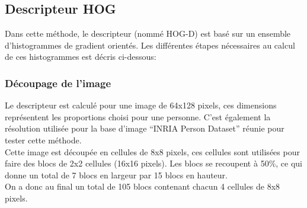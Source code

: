 \documentclass[12pt]{article}
\begin{document}
\subsection{Descripteur HOG}
Dans cette méthode, le descripteur (nommé HOG-D) est basé sur un ensemble d'histogrammes de gradient orientés. Les différentes étapes nécessaires au calcul de ces histogrammes est décris ci-dessous:
\subsubsection{Découpage de l'image}
Le descripteur est calculé pour une image de 64x128 pixels, ces dimensions représentent les proportions choisi pour une personne. C'est également la résolution utilisée pour la base d'image ``INRIA Person Dataset'' réunie pour tester cette méthode.\\
Cette image est découpée en cellules de 8x8 pixels, ces cellules sont utilisées pour faire des blocs de 2x2 cellules (16x16 pixels). Les blocs se recoupent à 50\%, ce qui donne un total de 7 blocs en largeur par 15 blocs en hauteur.\\
On a donc au final un total de 105 blocs contenant chacun 4 cellules de 8x8 pixels.
\end{document}
